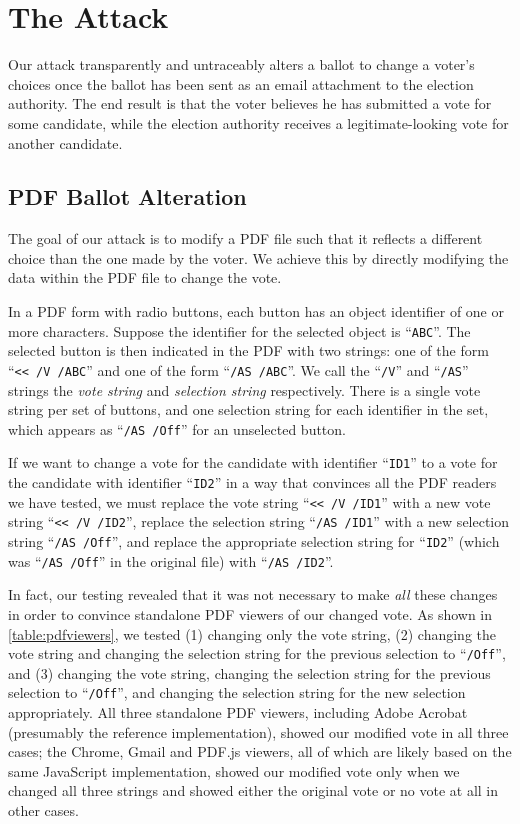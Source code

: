 \documentclass{article}
\begin{document}
\section{The Attack}

Our attack transparently and untraceably alters a ballot to change a
voter's choices once the ballot has been sent as an email attachment
to the election authority. The end result is that the voter believes
he has submitted a vote for some candidate, while the election
authority receives a legitimate-looking vote for another candidate.

\subsection{PDF Ballot Alteration}

The goal of our attack is to modify a PDF file such that it reflects a
different choice than the one made by the voter. We achieve this by
directly modifying the data within the PDF file to change the
vote. 

In a PDF form with radio buttons, each button has an object identifier
of one or more characters. Suppose the identifier for the selected
object is ``\texttt{ABC}''. The selected button is then indicated in
the PDF with two strings: one of the form ``\texttt{<{}< /V /ABC}''
and one of the form ``\texttt{/AS /ABC}''. We call the ``\texttt{/V}''
and ``\texttt{/AS}'' strings the \emph{vote string} and
\emph{selection string} respectively. There is a single vote string
per set of buttons, and one selection string for each identifier in
the set, which appears as ``\texttt{/AS /Off}'' for an unselected
button.

If we want to change a vote for the candidate with identifier
``\texttt{ID1}'' to a vote for the candidate with identifier
``\texttt{ID2}'' in a way that convinces all the PDF readers we have
tested, we must replace the vote string ``\texttt{<{}< /V /ID1}'' with
a new vote string ``\texttt{<{}< /V /ID2}'', replace the selection
string ``\texttt{/AS /ID1}'' with a new selection string ``\texttt{/AS
  /Off}'', and replace the appropriate selection string for
``\texttt{ID2}'' (which was ``\texttt{/AS /Off}'' in the original
file) with ``\texttt{/AS /ID2}''.

In fact, our testing revealed that it was not necessary to make
\emph{all} these changes in order to convince standalone PDF viewers
of our changed vote. As shown in \autoref{table:pdfviewers}, we tested
(1) changing only the vote string, (2) changing the vote string and
changing the selection string for the previous selection to
``\texttt{/Off}'', and (3) changing the vote string, changing the
selection string for the previous selection to ``\texttt{/Off}'', and
changing the selection string for the new selection appropriately. All
three standalone PDF viewers, including Adobe Acrobat (presumably the
reference implementation), showed our modified vote in all three
cases; the Chrome, Gmail and PDF.js viewers, all of which are likely
based on the same JavaScript implementation, showed our modified vote
only when we changed all three strings and showed either the original
vote or no vote at all in other cases. 
\end{document}
